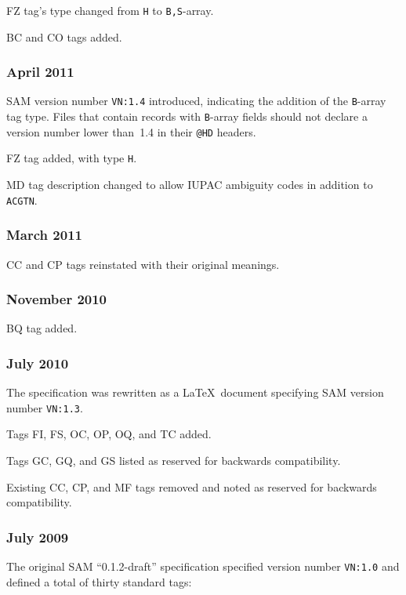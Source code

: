 \documentclass[10pt]{article}
\begin{document}
\begin{appendices}
FZ tag's type changed from {\tt H} to {\tt B,S}-array.

BC and CO tags added.

\subsubsection*{April 2011}

SAM version number {\tt VN:1.4} introduced, indicating the addition of the {\tt B}-array tag type.
Files that contain records with {\tt B}-array fields should not declare a version number lower than~1.4 in their {\tt @HD} headers.

\gap
FZ tag added, with type {\tt H}.

MD tag description changed to allow IUPAC ambiguity codes in addition to {\tt ACGTN}.

\subsubsection*{March 2011}

CC and CP tags reinstated with their original meanings.

\subsubsection*{November 2010}

BQ tag added.

\subsubsection*{July 2010}

The specification was rewritten as a \LaTeX\ document specifying SAM version number {\tt VN:1.3}.

\gap
Tags FI, FS, OC, OP, OQ, and TC added.

Tags GC, GQ, and GS listed as reserved for backwards compatibility.

Existing CC, CP, and MF tags removed and noted as reserved for backwards compatibility.

\subsubsection*{July 2009}

The original SAM ``0.1.2-draft'' specification specified version number {\tt VN:1.0} and defined a total of thirty standard tags:


\end{appendices}
\end{document}
